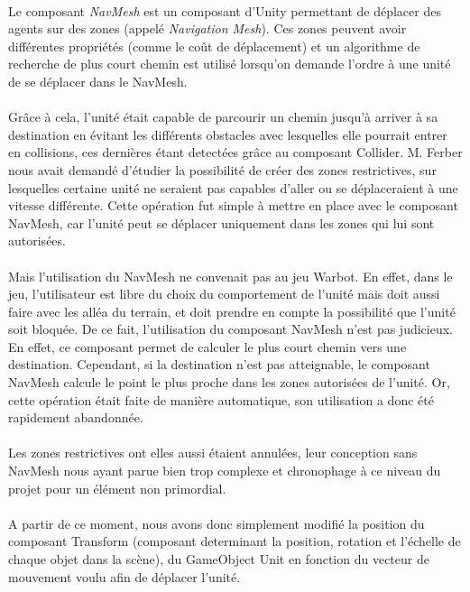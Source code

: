 \documentclass{report}
\begin{document}
\paragraph{}
 Le composant \textit{NavMesh} est un composant d'Unity permettant de déplacer des agents sur des zones (appelé \textit{Navigation Mesh}). Ces zones peuvent avoir différentes propriétés (comme le coût de déplacement) et un algorithme de recherche de plus court chemin est utilisé lorsqu'on demande l'ordre à une unité de se déplacer dans le NavMesh.
\paragraph{}
 Grâce à cela, l'unité était capable de parcourir un chemin jusqu'à arriver à sa destination en évitant les différents obstacles avec lesquelles elle pourrait entrer en collisions, ces dernières étant detectées grâce au composant Collider. M. Ferber nous avait demandé d'étudier la possibilité de créer des zones restrictives, sur lesquelles certaine unité ne seraient pas capables d'aller ou se déplaceraient à une vitesse différente. Cette opération fut simple à mettre en place avec le composant NavMesh, car l'unité peut se déplacer uniquement dans les zones qui lui sont autorisées.
\paragraph{}
Mais l'utilisation du NavMesh ne convenait pas au jeu Warbot. En effet, dans le jeu, l'utilisateur est libre du choix du comportement de l'unité mais doit aussi faire avec les alléa du terrain, et doit prendre en compte la possibilité que l'unité soit bloquée. De ce fait, l'utilisation du composant NavMesh n'est pas judicieux. En effet, ce composant permet de calculer le plus court chemin vers une destination. Cependant, si la destination n'est pas atteignable, le composant NavMesh calcule le point le plus proche dans les zones autorisées de l'unité. Or, cette opération était faite de manière automatique, son utilisation a donc été rapidement abandonnée. 
\paragraph{}
Les zones restrictives ont elles aussi étaient annulées, leur conception sans NavMesh nous ayant parue bien trop complexe et chronophage à ce niveau du projet pour un élément non primordial. 
\paragraph{}
A partir de ce moment, nous avons donc simplement modifié la position du composant Transform (composant determinant la position, rotation et l'échelle de chaque objet dans la scène), du GameObject Unit en fonction du vecteur de mouvement voulu afin de déplacer l'unité.
\end{document}
